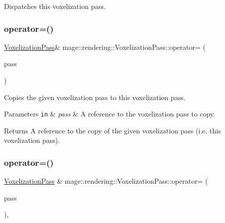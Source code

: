 Dispatches this voxelization pass. \mbox{\label{classmage_1_1rendering_1_1_voxelization_pass_a30bf15dac8660764cd1342a4f397e47e}} 
\subsubsection{\texorpdfstring{operator=()}{operator=()}\hspace{0.1cm}{\footnotesize\ttfamily [1/2]}}
{\footnotesize\ttfamily \mbox{\hyperlink{classmage_1_1rendering_1_1_voxelization_pass}{Voxelization\+Pass}}\& mage\+::rendering\+::\+Voxelization\+Pass\+::operator= (\begin{DoxyParamCaption}\item[{const \mbox{\hyperlink{classmage_1_1rendering_1_1_voxelization_pass}{Voxelization\+Pass}} \&}]{pass }\end{DoxyParamCaption})\hspace{0.3cm}{\ttfamily [delete]}}

Copies the given voxelization pass to this voxelization pass.


\begin{DoxyParams}[1]{Parameters}
\mbox{\tt in}  & {\em pass} & A reference to the voxelization pass to copy. \\
\hline
\end{DoxyParams}
\begin{DoxyReturn}{Returns}
A reference to the copy of the given voxelization pass (i.\+e. this voxelization pass). 
\end{DoxyReturn}
\mbox{\label{classmage_1_1rendering_1_1_voxelization_pass_ac7beb95fbf6fd85355703854ac282e91}} 
\subsubsection{\texorpdfstring{operator=()}{operator=()}\hspace{0.1cm}{\footnotesize\ttfamily [2/2]}}
{\footnotesize\ttfamily \mbox{\hyperlink{classmage_1_1rendering_1_1_voxelization_pass}{Voxelization\+Pass}} \& mage\+::rendering\+::\+Voxelization\+Pass\+::operator= (\begin{DoxyParamCaption}\item[{\mbox{\hyperlink{classmage_1_1rendering_1_1_voxelization_pass}{Voxelization\+Pass}} \&\&}]{pass }\end{DoxyParamCaption})\hspace{0.3cm}{\ttfamily [default]}, {\ttfamily [noexcept]}}

